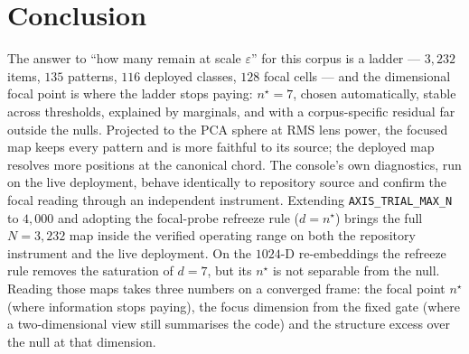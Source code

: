 \documentclass[11pt,a4paper]{article}
\theoremstyle{plain}
\theoremstyle{remark}
\begin{document}
\section{Conclusion}

The answer to ``how many remain at scale $\varepsilon$'' for this corpus is a ladder --- $3{,}232$ items, $135$ patterns, $116$ deployed classes, $128$ focal cells --- and the dimensional focal point is where the ladder stops paying: $n^\star=7$, chosen automatically, stable across thresholds, explained by marginals, and with a corpus-specific residual far outside the nulls. Projected to the PCA sphere at RMS lens power, the focused map keeps every pattern and is more faithful to its source; the deployed map resolves more positions at the canonical chord. The console's own diagnostics, run on the live deployment, behave identically to repository source and confirm the focal reading through an independent instrument. Extending \texttt{AXIS\_TRIAL\_MAX\_N} to $4{,}000$ and adopting the focal-probe refreeze rule ($d=n^\star$) brings the full $N=3{,}232$ map inside the verified operating range on both the repository instrument and the live deployment. On the $1024$-D re-embeddings the refreeze rule removes the saturation of $d=7$, but its $n^\star$ is not separable from the null. Reading those maps takes three numbers on a converged frame: the focal point $n^\star$ (where information stops paying), the focus dimension from the fixed gate (where a two-dimensional view still summarises the code) and the structure excess over the null at that dimension.
\end{document}

